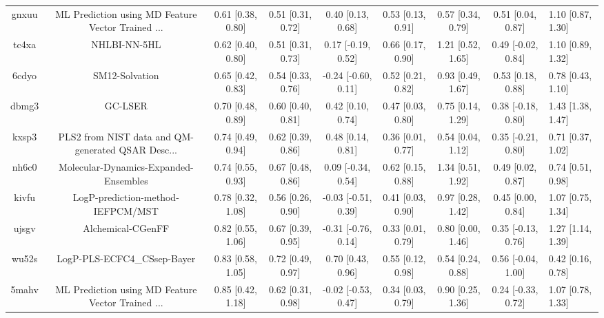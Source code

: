 \documentclass{article}
\begin{document}
\begin{center}
\begin{longtable}{|cccccccc|}
 gnxuu &  ML Prediction using MD Feature Vector Trained ... &  0.61 [0.38, 0.80] &  0.51 [0.31, 0.72] &     0.40 [0.13, 0.68] &  0.53 [0.13, 0.91] &    0.57 [0.34, 0.79] &    0.51 [0.04, 0.87] &     1.10 [0.87, 1.30] \\
 tc4xa &                                       NHLBI-NN-5HL &  0.62 [0.40, 0.80] &  0.51 [0.31, 0.73] &    0.17 [-0.19, 0.52] &  0.66 [0.17, 0.90] &    1.21 [0.52, 1.65] &   0.49 [-0.02, 0.84] &     1.10 [0.89, 1.32] \\
 6cdyo &                                     SM12-Solvation &  0.65 [0.42, 0.83] &  0.54 [0.33, 0.76] &   -0.24 [-0.60, 0.11] &  0.52 [0.21, 0.82] &    0.93 [0.49, 1.67] &    0.53 [0.18, 0.88] &     0.78 [0.43, 1.10] \\
 dbmg3 &                                            GC-LSER &  0.70 [0.48, 0.89] &  0.60 [0.40, 0.81] &     0.42 [0.10, 0.74] &  0.47 [0.03, 0.80] &    0.75 [0.14, 1.29] &   0.38 [-0.18, 0.80] &     1.43 [1.38, 1.47] \\
 kxsp3 &  PLS2 from NIST data and QM-generated QSAR Desc... &  0.74 [0.49, 0.94] &  0.62 [0.39, 0.86] &     0.48 [0.14, 0.81] &  0.36 [0.01, 0.77] &    0.54 [0.04, 1.12] &   0.35 [-0.21, 0.80] &     0.71 [0.37, 1.02] \\
 nh6c0 &              Molecular-Dynamics-Expanded-Ensembles &  0.74 [0.55, 0.93] &  0.67 [0.48, 0.86] &    0.09 [-0.34, 0.54] &  0.62 [0.15, 0.88] &    1.34 [0.51, 1.92] &    0.49 [0.02, 0.87] &     0.74 [0.51, 0.98] \\
 kivfu &                  LogP-prediction-method-IEFPCM/MST &  0.78 [0.32, 1.08] &  0.56 [0.26, 0.90] &   -0.03 [-0.51, 0.39] &  0.41 [0.03, 0.90] &    0.97 [0.28, 1.42] &    0.45 [0.00, 0.84] &     1.07 [0.75, 1.34] \\
 ujsgv &                                  Alchemical-CGenFF &  0.82 [0.55, 1.06] &  0.67 [0.39, 0.95] &   -0.31 [-0.76, 0.14] &  0.33 [0.01, 0.79] &    0.80 [0.00, 1.46] &   0.35 [-0.13, 0.76] &     1.27 [1.14, 1.39] \\
 wu52s &                        LogP-PLS-ECFC4\_CSsep-Bayer &  0.83 [0.58, 1.05] &  0.72 [0.49, 0.97] &     0.70 [0.43, 0.96] &  0.55 [0.12, 0.98] &    0.54 [0.24, 0.88] &   0.56 [-0.04, 1.00] &     0.42 [0.16, 0.78] \\
 5mahv &  ML Prediction using MD Feature Vector Trained ... &  0.85 [0.42, 1.18] &  0.62 [0.31, 0.98] &   -0.02 [-0.53, 0.47] &  0.34 [0.03, 0.79] &    0.90 [0.25, 1.36] &   0.24 [-0.33, 0.72] &     1.07 [0.78, 1.33] \\

\end{longtable}
\end{center}
\end{document}
